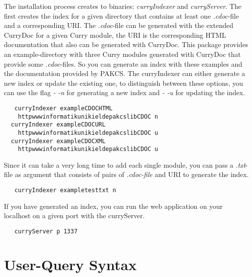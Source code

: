 \documentclass[%
	pdftex,%
	a4paper,%
	oneside,%
	chapterprefix,%
	headsepline,%
	12pt%
]{scrbook}
\begin{document}
The installation process creates to binaries: \emph{curryIndexer} and
\emph{curryServer}. %
The first creates the index for a given directory that contains at
least one \emph{.cdoc}-file and a corresponding URI. %
The \emph{.cdoc}-file can be generated with the extended CurryDoc for
a given Curry module, the URI is the corresponding HTML documentation
that also can be generated with CurryDoc. %
This package provides an example-directory with three Curry modules
generated with CurryDoc that provide some \emph{.cdoc}-files. %
So you can generate an index with these examples and the documentation
provided by PAKCS. %
The curryIndexer can either generate a new index or update the
existing one, to distinguish between these options, you can use the
flag \emph{- -n} for generating a new index and \emph{- -u} for
updating the index.

\begin{tabbing}\tt
~~curryIndexer~exampleCDOCHTML~\\
\tt ~~~~httpwwwinformatikunikieldepakcslibCDOC~n\\
\tt ~~curryIndexer~exampleCDOCURL~\\
\tt ~~~~httpwwwinformatikunikieldepakcslibCDOC~u\\
\tt ~~curryIndexer~exampleCDOCXML~\\
\tt ~~~~httpwwwinformatikunikieldepakcslibCDOC~u
\end{tabbing}

Since it can take a very long time to add each single module, you can
pass a \emph{.txt}-file as argument that consists of pairs of \emph{.cdoc-file} and
URI to generate the index.

\begin{tabbing}\tt
~~curryIndexer~exampletesttxt~n
\end{tabbing}

If you have generated an index, you can run the web application on your
localhost on a given port with the curryServer.

\begin{tabbing}\tt
~~curryServer~p~1337
\end{tabbing}

\chapter{User-Query Syntax}\label{a:syntax}



% 
\end{document}
